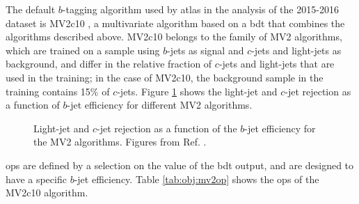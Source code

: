 The default $b$-tagging algorithm used by \gls{atlas} in the analysis of the 2015-2016 dataset is MV2c10 
\cite{ATL-PHYS-PUB-2015-022,ATL-PHYS-PUB-2016-012}, 
a multivariate algorithm based on a \gls{bdt} that combines the algorithms described above. 
MV2c10 belongs to the family of MV2 algorithms, which are trained on a \ttbar sample using $b$-jets as signal and $c$-jets and light-jets as background, and differ in the relative fraction of $c$-jets and light-jets that are
used in the training; in the case of MV2c10, the background sample in the training contains 15\% of $c$-jets.
Figure \ref{fig:obj:mv2} shows the light-jet and $c$-jet rejection as a function of $b$-jet efficiency for different MV2 algorithms.

\begin{figure}[h]
\begin{center}
\end{center}
 \caption{Light-jet  and $c$-jet  rejection as a function of the $b$-jet efficiency for the MV2 algorithms. Figures from Ref. \cite{ATL-PHYS-PUB-2016-012}.}
  \label{fig:obj:mv2}
\end{figure}

\glspl{op} are defined by a selection on the value of the \gls{bdt} output, and are designed to have a specific $b$-jet efficiency.
Table \ref{tab:obj:mv2op} shows the \glspl{op} of the MV2c10 algorithm.

